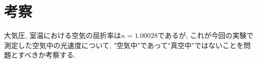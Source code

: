 \documentclass{jarticle}
\begin{document}
\section{考察}


大気圧, 室温における空気の屈折率は$n=1.00028$であるが, これが今回の実験で測定した空気中の光速度について, "空気中"であって"真空中"ではないことを問題とすべきか考察する.



\begin{thebibliography}{99}


\end{thebibliography}
\end{document}
